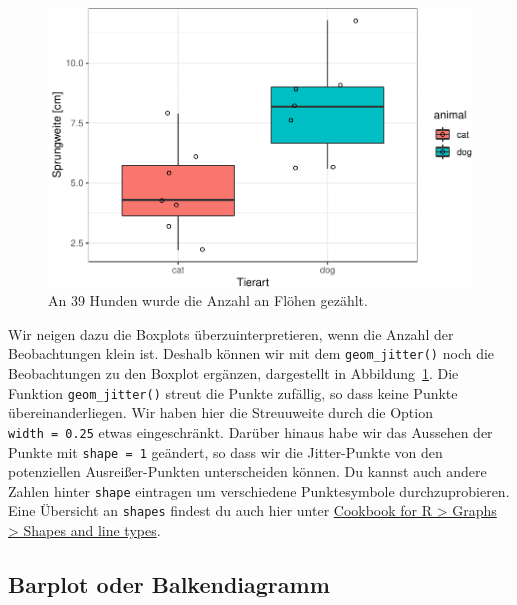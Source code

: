 \documentclass[
  letterpaper,
]{scrbook}
\begin{document}
\begin{figure}[H]

{\centering \includegraphics{./eda-ggplot_files/figure-pdf/fig-boxplot-freshmatter-2-1.pdf}

}

\caption{\label{fig-boxplot-freshmatter-2}An 39 Hunden wurde die Anzahl
an Flöhen gezählt.}

\end{figure}

Wir neigen dazu die Boxplots überzuinterpretieren, wenn die Anzahl der
Beobachtungen klein ist. Deshalb können wir mit dem
\texttt{geom\_jitter()} noch die Beobachtungen zu den Boxplot ergänzen,
dargestellt in Abbildung~\ref{fig-boxplot-freshmatter-2}. Die Funktion
\texttt{geom\_jitter()} streut die Punkte zufällig, so dass keine Punkte
übereinanderliegen. Wir haben hier die Streuuweite durch die Option
\texttt{width\ =\ 0.25} etwas eingeschränkt. Darüber hinaus habe wir das
Aussehen der Punkte mit \texttt{shape\ =\ 1} geändert, so dass wir die
Jitter-Punkte von den potenziellen Ausreißer-Punkten unterscheiden
können. Du kannst auch andere Zahlen hinter \texttt{shape} eintragen um
verschiedene Punktesymbole durchzuprobieren. Eine Übersicht an
\texttt{shapes} findest du auch hier unter
\href{http://www.cookbook-r.com/Graphs/Shapes_and_line_types/}{Cookbook
for R \textgreater{} Graphs \textgreater{} Shapes and line types}.

\hypertarget{sec-eda-barplot}{%
\subsection{Barplot oder Balkendiagramm}\label{sec-eda-barplot}}
\end{document}
